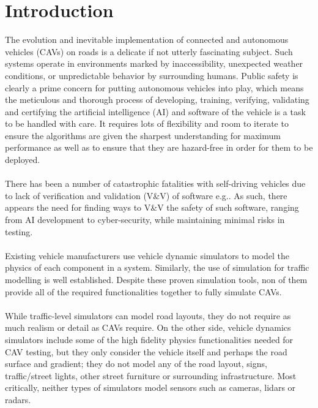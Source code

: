\section{Introduction}
\noindent The evolution and inevitable implementation of connected and autonomous vehicles (CAVs) on roads is a delicate if not utterly fascinating subject.
Such systems operate in environments marked by inaccessibility, unexpected weather conditions, or unpredictable behavior by surrounding humans\cite{RobustnessAutonomy}. 
Public safety is clearly a prime concern for putting autonomous vehicles into play, which means the meticulous and thorough process of developing, training, verifying, validating and certifying the artificial intelligence (AI) and software of the vehicle is a task to be handled with care. 
It requires lots of flexibility and room to iterate to ensure the algorithms are given the sharpest understanding for maximum performance as well as to ensure that they are hazard-free in order for them to be deployed\cite{AirsimUnrealArticle}.\\\\
\noindent There has been a number of catastrophic fatalities with self-driving vehicles due to lack of verification and validation (V\&V) of software e.g.\cite{FatalityExample}.
As such, there appears the need for finding ways to V\&V the safety of such software, ranging from AI development to cyber-security, while maintaining minimal risks in testing.\\\\
\noindent Existing vehicle manufacturers use vehicle dynamic simulators to model the physics of each component in a system. 
Similarly, the use of simulation for traffic modelling is well established. 
Despite these proven simulation tools, non of them provide all of the required functionalities together to fully simulate CAVs\cite{FrameworkAndChallenges}.\\\\
While traffic-level simulators can model road layouts, they do not require as much realism or detail as CAVs require. On the other side, vehicle dynamics simulators include some of the high fidelity physics functionalities needed for CAV testing, but they only consider the vehicle itself and perhaps the road surface and gradient; they do not model any of the road layout, signs, traffic/street lights, other street furniture or surrounding infrastructure. 
Most critically, neither types of simulators model sensors such as cameras, lidars or radars\cite{FrameworkAndChallenges}.\\\\ 
